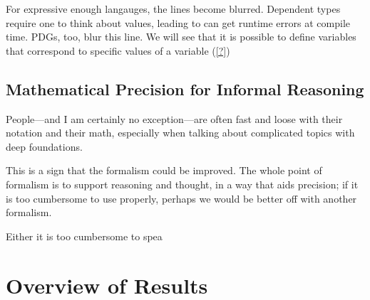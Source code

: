 For expressive enough langauges, the lines become blurred. 
Dependent types require one to think about values, leading to can get runtime errors at compile time. 
PDGs, too, blur this line.  We will see that it is possible to define variables that correspond to specific values of a variable (\cref{?})

%


\subsection{Mathematical Precision for Informal Reasoning}
People---and I am certainly no exception---are often fast and loose with their notation and their math, especially when talking about complicated topics with deep foundations. 

    
This is a sign that the formalism could be improved.
The whole point of formalism is to support reasoning and thought, 
    in a way that aids precision; if it is too cumbersome to use properly,
    perhaps we would be better off with another formalism.
    
Either it is too cumbersome to spea


\section{Overview of Results}
